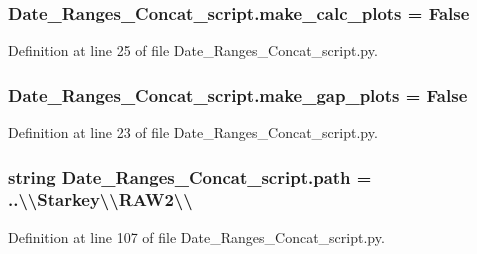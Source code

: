 \subsubsection[{make\+\_\+calc\+\_\+plots}]{\setlength{\rightskip}{0pt plus 5cm}Date\+\_\+\+Ranges\+\_\+\+Concat\+\_\+script.\+make\+\_\+calc\+\_\+plots = False}\label{namespace_date___ranges___concat__script_af9826d87d967e0af51a56f35bb53dbad}


Definition at line 25 of file Date\+\_\+\+Ranges\+\_\+\+Concat\+\_\+script.\+py.

\hypertarget{namespace_date___ranges___concat__script_a8daa59e883d598cddf6265daf73b3368}{}
\subsubsection[{make\+\_\+gap\+\_\+plots}]{\setlength{\rightskip}{0pt plus 5cm}Date\+\_\+\+Ranges\+\_\+\+Concat\+\_\+script.\+make\+\_\+gap\+\_\+plots = False}\label{namespace_date___ranges___concat__script_a8daa59e883d598cddf6265daf73b3368}


Definition at line 23 of file Date\+\_\+\+Ranges\+\_\+\+Concat\+\_\+script.\+py.

\hypertarget{namespace_date___ranges___concat__script_a8333f861dcf7a2c4d8513c76222f5c6a}{}
\subsubsection[{path}]{\setlength{\rightskip}{0pt plus 5cm}string Date\+\_\+\+Ranges\+\_\+\+Concat\+\_\+script.\+path = \textquotesingle{}..\textbackslash{}\textbackslash{}Starkey\textbackslash{}\textbackslash{}\+R\+A\+W2\textbackslash{}\textbackslash{}\textquotesingle{}}\label{namespace_date___ranges___concat__script_a8333f861dcf7a2c4d8513c76222f5c6a}


Definition at line 107 of file Date\+\_\+\+Ranges\+\_\+\+Concat\+\_\+script.\+py.

\hypertarget{namespace_date___ranges___concat__script_a8d1f404553f799bb9ff6063b634827a3}{}

